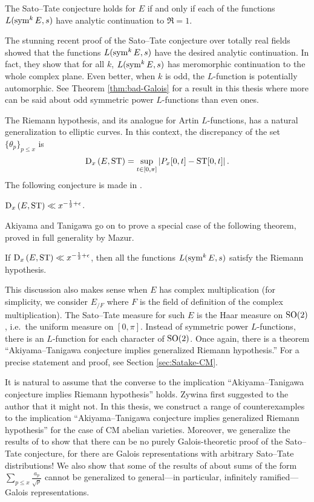 \begin{theorem}
The Sato--Tate conjecture holds for $E$ if and only if each of 
the functions $L(\operatorname{sym}^k E,s)$ have analytic continuation to $\Re = 1$. 
\end{theorem}

The stunning recent proof of the Sato--Tate conjecture over totally real fields 
showed that the functions $L(\operatorname{sym}^k E,s)$ have the desired analytic 
continuation. In fact, they show that for all $k$, $L(\operatorname{sym}^k E,s)$ has 
meromorphic continuation to the whole complex plane. Even better, when $k$ is 
odd, the $L$-function is potentially automorphic. See Theorem 
\ref{thm:bad-Galois} for a result in this thesis where more can be said about 
odd symmetric power $L$-functions than even ones. 

The Riemann hypothesis, and its analogue for Artin $L$-functions, has a natural 
generalization to elliptic curves. In this context, the discrepancy of the set 
$\{\theta_p\}_{p\leqslant x}$ is 
\[
	\operatorname{D}_x\left(E,\mathrm{ST}\right) = \sup_{t\in [0,\pi]} \left| P_x[0,t] - \mathrm{ST}[0,t]\right| .
\]
The following conjecture is made in \cite{akiyama-tanigawa-1999}.

\begin{conjecture}\label{conj:akiyama-tanigawa}
$\operatorname{D}_x\left(E,\mathrm{ST}\right)\ll x^{-\frac 1 2+\epsilon}$.
\end{conjecture}

Akiyama and Tanigawa go on to prove a special case of the following theorem, 
proved in full generality by Mazur. 

\begin{theorem}
If $\operatorname{D}_x\left(E,\mathrm{ST}\right)\ll x^{-\frac 1 2+\epsilon}$, 
then all the functions $L(\operatorname{sym}^k E, s)$ satisfy the Riemann hypothesis. 
\end{theorem}

This discussion also makes sense when $E$ has complex multiplication (for 
simplicity, we consider $E_{/F}$ where $F$ is the field of definition of the 
complex multiplication). The Sato--Tate measure for such $E$ is the Haar 
measure on $\operatorname{SO}(2)$, i.e.~the uniform measure on $[0,\pi]$. Instead of 
symmetric power $L$-functions, there is an $L$-function for each character of 
$\operatorname{SO}(2)$. Once again, there is a theorem ``Akiyama--Tanigawa conjecture implies 
generalized Riemann hypothesis.'' For a precise statement and proof, see Section 
\ref{sec:Satake-CM}.

It is natural to assume that the converse to the implication 
``Akiyama--Tanigawa conjecture implies Riemann hypothesis'' holds. Zywina 
first suggested to the author that it might not. In this thesis, we construct a 
range of counterexamples to the implication ``Akiyama--Tanigawa conjecture implies 
generalized Riemann hypothesis'' for the case of CM abelian varieties. 
Moreover, we generalize the results of \cite{pande-2011} to show that there can 
be no purely Galois-theoretic proof of the Sato--Tate conjecture, for there are 
Galois representations with arbitrary Sato--Tate distributions! We also show 
that some of the results of \cite{sarnak-2007} about sums of the form 
$\sum_{p\leqslant x} \frac{a_p}{\sqrt p}$ cannot be generalized to 
general---in particular, infinitely ramified---Galois representations. 
